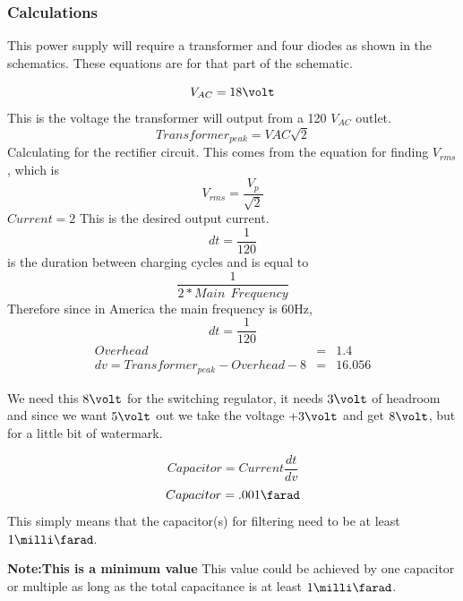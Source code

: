 \subsubsection{Calculations}
This power supply will require a transformer and four diodes as shown in the schematics. These equations are for that part of the schematic.

\begin{equation}
V_{AC}=18 \volt
\end{equation}
 This is the voltage the transformer will output from a 120 $V_{AC}$ outlet.
\begin{equation}
Transformer_{peak}=VAC\sqrt{2}
\end{equation}
 Calculating for the rectifier circuit. This comes from the equation for finding $V_{rms}$, which is 
\begin{equation}
V_{rms}=\frac{V_p}{\sqrt{2}}
\end{equation}
$Current=2$ This is the desired output current.
\begin{equation}
dt=\frac{1}{120}
\end{equation} 
is the duration between charging cycles and is equal to 
\begin{equation}
\frac{1}{2*Main \ \ Frequency}
\end{equation}
 Therefore since in America the main frequency is 60Hz, 
\begin{equation}
dt=\frac{1}{120}
\end{equation}
\begin{eqnarray}
Overhead&=&1.4\\
dv=Transformer_{peak}-Overhead-8&=&16.056
\end{eqnarray}

We need this $8\volt$ for the switching regulator, it needs $3\volt$ of headroom and since we want $5\volt$ out we take the voltage $+3\volt$ and get $8\volt$, but for a little bit of watermark.

\begin{equation}
Capacitor=Current\frac{dt}{dv}
\end{equation}
\begin{equation}
Capacitor=.001\farad
\end{equation}
 This simply means that the capacitor(s) for filtering need to be at least $1\milli\farad$.

\textbf{Note:This is a minimum value} This value could be achieved by one capacitor or multiple as long as the total capacitance is at least $1\milli\farad$.

